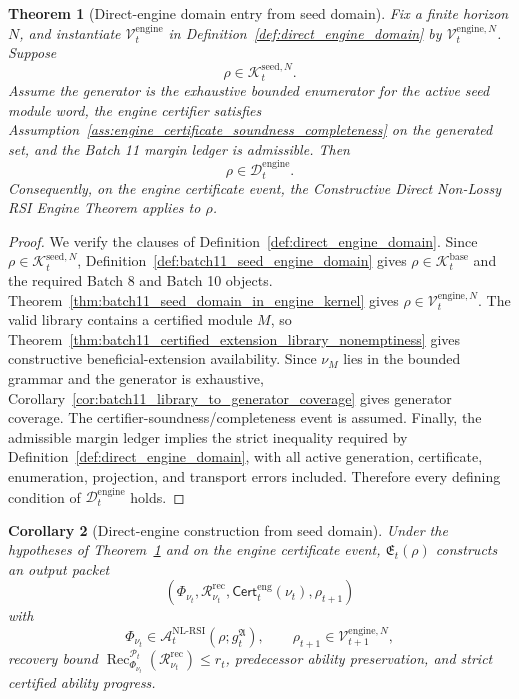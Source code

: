 \documentclass[11pt]{article}
\newtheorem{theorem}{Theorem}[section]
\newtheorem{corollary}[theorem]{Corollary}
\newcommand{\Acal}{\mathcal{A}}
\newcommand{\Pcal}{\mathcal{P}}
\newcommand{\Rcal}{\mathcal{R}}
\newcommand{\1}{\mathbf{1}}
\providecommand{\Dcal}{\mathcal{D}}
\providecommand{\Kcal}{\mathcal{K}}
\providecommand{\Vcal}{\mathcal{V}}
\providecommand{\Rec}{\operatorname{Rec}}
\begin{document}
\begin{theorem}[Direct-engine domain entry from seed domain]
\label{thm:batch11_direct_engine_domain_entry}
Fix a finite horizon \(N\), and instantiate \(\Vcal_t^{\mathrm{engine}}\) in Definition~\ref{def:direct_engine_domain} by \(\Vcal_t^{\mathrm{engine},N}\).  Suppose
\[
\rho\in\Kcal_t^{\mathrm{seed},N}.
\]
Assume the generator is the exhaustive bounded enumerator for the active seed module word, the engine certifier satisfies Assumption~\ref{ass:engine_certificate_soundness_completeness} on the generated set, and the Batch 11 margin ledger is admissible.  Then
\[
\rho\in\Dcal_t^{\mathrm{engine}}.
\]
Consequently, on the engine certificate event, the Constructive Direct Non-Lossy RSI Engine Theorem applies to \(\rho\).
\end{theorem}

\begin{proof}
We verify the clauses of Definition~\ref{def:direct_engine_domain}.  Since \(\rho\in\Kcal_t^{\mathrm{seed},N}\), Definition~\ref{def:batch11_seed_engine_domain} gives \(\rho\in\Kcal_t^{\mathrm{base}}\) and the required Batch 8 and Batch 10 objects.  Theorem~\ref{thm:batch11_seed_domain_in_engine_kernel} gives \(\rho\in\Vcal_t^{\mathrm{engine},N}\).  The valid library contains a certified module \(M\), so Theorem~\ref{thm:batch11_certified_extension_library_nonemptiness} gives constructive beneficial-extension availability.  Since \(\nu_M\) lies in the bounded grammar and the generator is exhaustive, Corollary~\ref{cor:batch11_library_to_generator_coverage} gives generator coverage.  The certifier-soundness/completeness event is assumed.  Finally, the admissible margin ledger implies the strict inequality required by Definition~\ref{def:direct_engine_domain}, with all active generation, certificate, enumeration, projection, and transport errors included.  Therefore every defining condition of \(\Dcal_t^{\mathrm{engine}}\) holds.
\end{proof}

\begin{corollary}[Direct-engine construction from seed domain]
\label{cor:batch11_direct_engine_construction_from_seed_domain}
Under the hypotheses of Theorem~\ref{thm:batch11_direct_engine_domain_entry} and on the engine certificate event, \(\mathfrak E_t(\rho)\) constructs an output packet
\[
(\Phi_{\nu_t},\Rcal_{\nu_t}^{\mathrm{rec}},\mathsf{Cert}_t^{\mathrm{eng}}(\nu_t),\rho_{t+1})
\]
with
\[
\Phi_{\nu_t}\in\Acal_t^{\mathrm{NL\mbox{-}RSI}}(\rho;g_t^{\mathfrak A}),
\qquad
\rho_{t+1}\in\Vcal_{t+1}^{\mathrm{engine},N},
\]
recovery bound \(\Rec_{\Phi_{\nu_t}}^{\Pcal_t}(\Rcal_{\nu_t}^{\mathrm{rec}})\le r_t\), predecessor ability preservation, and strict certified ability progress.
\end{corollary}
\end{document}
